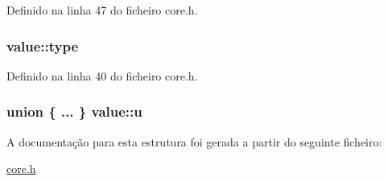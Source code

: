 Definido na linha 47 do ficheiro core.\-h.

\hypertarget{structvalue_a8193b2471a420d07d6273ea3c9653155}{
\subsubsection[{type}]{ value\-::type}}\label{structvalue_a8193b2471a420d07d6273ea3c9653155}


Definido na linha 40 do ficheiro core.\-h.

\hypertarget{structvalue_acee60f59572f5488da8ac5748e80e9cc}{
\subsubsection[{u}]{\setlength{\rightskip}{0pt plus 5cm}union \{ ... \}   value\-::u}}\label{structvalue_acee60f59572f5488da8ac5748e80e9cc}


A documentação para esta estrutura foi gerada a partir do seguinte ficheiro\-:\begin{DoxyCompactItemize}
\item 
\hyperlink{core_8h}{core.\-h}\end{DoxyCompactItemize}
